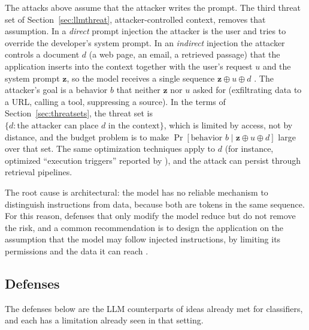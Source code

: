 \documentclass[10pt,a4paper]{extarticle}
\theoremstyle{definition}
\begin{document}
The attacks above assume that the attacker writes the prompt. The third threat set of Section~\ref{sec:llmthreat}, attacker-controlled context, removes that assumption. In a \emph{direct} prompt injection the attacker is the user and tries to override the developer's system prompt. In an \emph{indirect} injection the attacker controls a document \(d\) (a web page, an email, a retrieved passage) that the application inserts into the context together with the user's request \(u\) and the system prompt \(\mathbf{z}\), so the model receives a single sequence \(\mathbf{z}\oplus u\oplus d\) \citep{greshake2023not,nist2025ai1002}. The attacker's goal is a behavior \(b\) that neither \(\mathbf{z}\) nor \(u\) asked for (exfiltrating data to a URL, calling a tool, suppressing a source). In the terms of Section~\ref{sec:threatsets}, the threat set is \(\{d:\text{the attacker can place }d\text{ in the context}\}\), which is limited by access, not by distance, and the budget problem is to make \(\Pr[\text{behavior }b\mid\mathbf{z}\oplus u\oplus d]\) large over that set. The same optimization techniques apply to \(d\) (for instance, optimized \enquote{execution triggers} reported by \citet{nist2025ai1002}), and the attack can persist through retrieval pipelines.

The root cause is architectural: the model has no reliable mechanism to distinguish instructions from data, because both are tokens in the same sequence. For this reason, defenses that only modify the model reduce but do not remove the risk, and a common recommendation is to design the application on the assumption that the model may follow injected instructions, by limiting its permissions and the data it can reach \citep{nist2025ai1002}.

\subsection{Defenses}\label{sec:llmdef}

The defenses below are the LLM counterparts of ideas already met for classifiers, and each has a limitation already seen in that setting.
\end{document}
